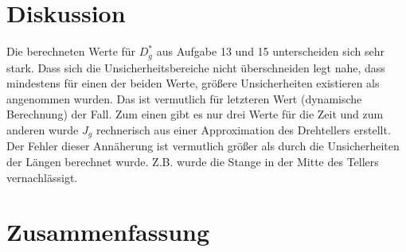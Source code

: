 \documentclass[a4paper,11pt,ngerman]{scrartcl}
\begin{document}
\section{Diskussion}
Die berechneten Werte für $D^*_g$ aus Aufgabe 13 und 15 unterscheiden sich sehr stark. Dass sich die Unsicherheitsbereiche nicht überschneiden legt nahe, dass mindestens für einen der beiden Werte, größere Unsicherheiten existieren als angenommen wurden. Das ist vermutlich für letzteren Wert (dynamische Berechnung) der Fall. Zum einen gibt es nur drei Werte für die Zeit und zum anderen wurde $J_g$ rechnerisch aus einer Approximation des Drehtellers erstellt. Der Fehler dieser Annäherung ist vermutlich größer als durch die Unsicherheiten der Längen berechnet wurde. Z.B. wurde die Stange in der Mitte des Tellers vernachlässigt.

\section{Zusammenfassung}



\end{document}
